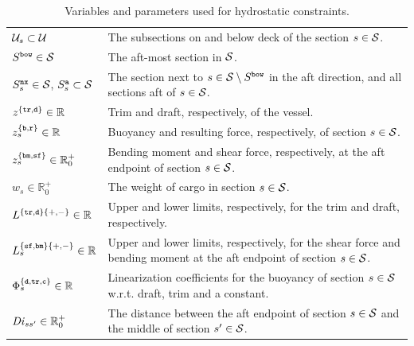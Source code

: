 \begin{table}[htbp]
\begin{tabular}{lp{10cm}}
$\mathcal{U}_s\subset\mathcal{U}$															& The subsections on and below deck of the section $s\in\mathcal{S}$.\\
$S^\texttt{bow}\in\mathcal{S}$															& The aft-most section in $\mathcal{S}$.\\
$S^\texttt{nx}_s\in\mathcal{S}$, $S^\texttt{a}_s\subset\mathcal{S}$	& The section next to $s\in\mathcal{S}\setminus S^\texttt{bow}$ in the aft direction, and all sections aft of $s\in\mathcal{S}$.\\
\hline
$z^{\{\texttt{tr},\texttt{d}\}}\in\mathbb{R}$ 						&	Trim and draft, respectively, of the vessel.\\
$z^{\{\texttt{b},\texttt{r}\}}_{s}\in \mathbb{R}$					&	Buoyancy and resulting force, respectively, of section $s\in\mathcal{S}$.\\
$z^{\{\texttt{bm},\texttt{sf}\}}_{s}\in \mathbb{R}^+_0$		&	Bending moment and shear force, respectively, at the aft endpoint of section $s\in\mathcal{S}$.\\
$w_{s} \in\mathbb{R}^+_0$														&	The weight of cargo in section $s\in\mathcal{S}$.\\
\hline
$L^{\{\texttt{tr},\texttt{d}\}\{+,-\}}\in\mathbb{R}$					& Upper and lower limits, respectively, for the trim and draft, respectively.\\
$L^{\{\texttt{sf},\texttt{bm}\}\{+,-\}}_{s}\in\mathbb{R}$			& Upper and lower limits, respectively, for the shear force and bending moment at the aft endpoint of section $s\in\mathcal{S}$.\\
$\Phi^{\{\texttt{d},\texttt{tr},\texttt{c}\}}_{s}\in\mathbb{R}$	& Linearization coefficients for the buoyancy of section $s\in \mathcal{S}$ w.r.t. draft, trim and a constant.\\
$\mathit{Di}_{ss'}\in \mathbb{R}^+_0$												& The distance between the aft endpoint of section $s\in\mathcal{S}$ and the middle of section $s'\in\mathcal{S}$.\\
\end{tabular}
\caption{Variables and parameters used for hydrostatic constraints.}\label{tab:hydro}
\end{table}

